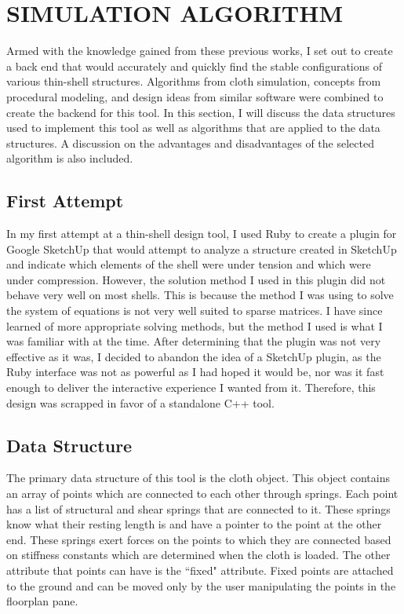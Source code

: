 \documentclass{thesis}
\begin{document}
\chapter{SIMULATION ALGORITHM}
Armed with the knowledge gained from these previous works, I set out to create a back end that would accurately
and quickly find the stable configurations of various thin-shell structures.  Algorithms from cloth simulation,
concepts from procedural modeling, and design ideas from similar software were combined to create the backend for
this tool.  In this section, I will discuss the data structures used to implement this tool as well as algorithms
that are applied to the data structures.  A discussion on the advantages and disadvantages of the selected algorithm
is also included.

\section{First Attempt}
\label{sec:initial}
In my first attempt at a thin-shell design tool, I used Ruby to create a plugin for Google SketchUp that would attempt to analyze
a structure created in SketchUp and indicate which elements of the shell were under tension and which were under compression.
However, the solution method I used in this plugin did not behave very well on most shells.  This is because the method I was
using to solve the system of equations is not very well suited to sparse matrices.  I have since learned of more appropriate
solving methods, but the method I used is what I was familiar with at the time.  After determining that the plugin was not
very effective as it was, I decided to abandon the idea of a SketchUp plugin, as the Ruby interface was not as powerful as I had
hoped it would be, nor was it fast enough to deliver the interactive experience I wanted from it.  Therefore, this design was
scrapped in favor of a standalone C++ tool.

\section{Data Structure}
The primary data structure of this tool is the cloth object.  This object contains an array of points which are connected to each
other through springs. Each point has a list of structural and shear springs that are connected to it.  These springs know what
their resting length is and have a pointer to the point at the other end.  These springs exert forces on the points to which they
are connected based on stiffness constants which are determined when the cloth is loaded.  The other attribute that points can
have is the ``fixed" attribute.  Fixed points are attached to the ground and can be moved only by the user manipulating the
points in the floorplan pane.
\end{document}
